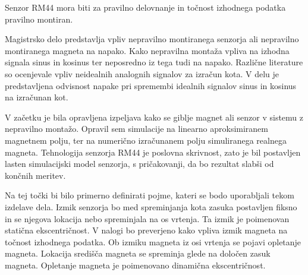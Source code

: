 Senzor RM44 mora biti za pravilno delovnanje in točnost izhodnega podatka pravilno montiran.%

Magistrsko delo predstavlja vpliv nepravilno montiranega senzorja ali nepravilno montiranega magneta na napako. Kako nepravilna montaža vpliva na izhodna signala sinus in kosinus ter neposredno iz tega tudi na napako.
Različne literature so ocenjevale vpliv neidealnih analognih signalov za izračun kota\cite{osnova}\cite{RLS1}\cite{RLS2}. V delu je predstavljena odvisnost napake pri spremembi idealnih signalov sinus in kosinus na izračunan kot.

V začetku je bila opravljena  izpeljava kako se giblje magnet ali senzor v sistemu z nepravilno montažo\cite{ursic}. Opravil sem simulacije na linearno aproksimiranem magnetnem polju, ter na numerično izračunanem polju simuliranega realnega magneta.
Tehnologija senzorja RM44 je poslovna skrivnost, zato je bil postavljen lasten simulacijski model senzorja, s pričakovanji, da bo rezultat  slabši od končnih meritev.

Na tej točki bi bilo primerno definirati pojme, kateri se bodo uporabljali tekom izdelave dela.
Izmik senzorja bo med spreminjanja kota zasuka postavljen fiksno in se njegova lokacija nebo spreminjala na os vrtenja. Ta izmik je poimenovan statična ekscentričnost.
V nalogi bo preverjeno kako vpliva izmik magneta na točnost izhodnega podatka. Ob izmiku magneta iz osi vrtenja se pojavi opletanje magneta. Lokacija središča magneta se spreminja glede na določen zasuk magneta. Opletanje magneta je poimenovano dinamična ekscentričnost.














%
%
%
%
%
